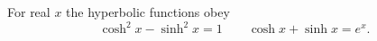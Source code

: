 \documentclass{article}
\begin{document}
For real $x$ the hyperbolic functions obey
\begin{equation}
\cosh^2 x - \sinh^2 x = 1 \qquad \cosh x + \sinh x = e^{x} .
\label{eq:hyp}
\end{equation}
\end{document}
